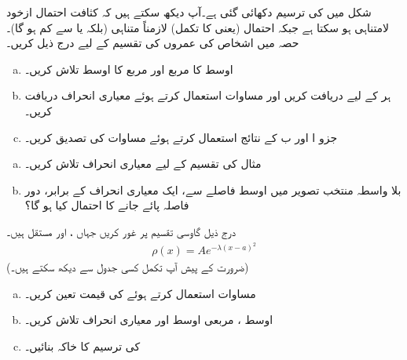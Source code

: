  شکل  میں    کی ترسیم دکھائی گئی ہے۔آپ دیکھ سکتے ہیں کہ کثافت احتمال ازخود لامتناہی ہو سکتا ہے جبکہ  احتمال (یعنی  کا تکمل) لازمناً  متناہی (بلکہ   یا  سے کم ہو گا)۔
 حصہ  میں اشخاص کی عمروں کی تقسیم کے لیے درج ذیل کریں۔ 
\begin{enumerate}[a.]
\item
اوسط کا مربع  اور مربع کا اوسط  تلاش کریں۔ 
\item
 ہر   کے لیے  دریافت کریں اور مساوات  استعمال کرتے ہوئے  معیاری انحراف دریافت کریں۔
\item
 جزو ا اور ب کے نتائج استعمال کرتے ہوئے مساوات   کی تصدیق کریں۔ 
\end{enumerate}
\begin{enumerate}[a.]
\item
 مثال  کی تقسیم کے لیے معیاری انحراف تلاش کریں۔
\item
بلا واسطہ منتخب تصویر میں  اوسط فاصلے سے، ایک معیاری انحراف کے برابر، دور فاصلہ  پائے جانے کا احتمال کیا ہو گا؟
\end{enumerate}
درج ذیل گاوسی تقسیم پر غور کریں  جہاں    ،  اور  مستقل ہیں۔  
\begin{align*}
\rho(x)=Ae^{-\lambda(x-a)^2}
\end{align*}
   (ضرورت کے پیش آپ تکمل کسی جدول سے دیکھ سکتے ہیں۔)
\begin{enumerate}[a.]
\item
مساوات استعمال کرتے ہوئے   کی قیمت تعین کریں۔
\item
اوسط ، مربعی اوسط  اور معیاری انحراف  تلاش کریں۔
\item
{} کی ترسیم کا خاکہ بنائیں۔
\end{enumerate}

